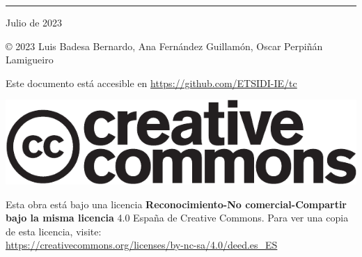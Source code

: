 
\chapterprecis{\vfill{}
}
\rule[.5ex]{\linewidth}{1pt} 

Julio de 2023

© 2023 Luis Badesa Bernardo, Ana Fernández Guillamón, Oscar Perpiñán Lamigueiro

Este documento está accesible en \url{https://github.com/ETSIDI-IE/tc}

\begin{center}
\includegraphics[scale=0.5]{../figs/cc-logo}
\par\end{center}

Esta obra está bajo una licencia \textbf{Reconocimiento-No comercial-Compartir
bajo la misma licencia} 4.0 España de Creative Commons. Para ver una
copia de esta licencia, visite:\\
 \url{https://creativecommons.org/licenses/by-nc-sa/4.0/deed.es_ES}


